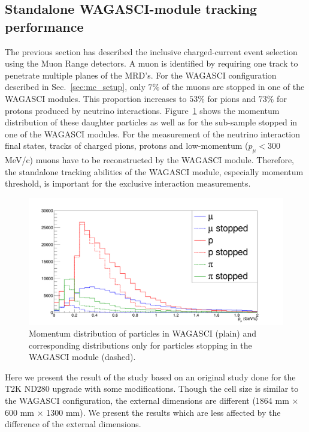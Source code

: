 \subsection{Standalone WAGASCI-module tracking performance}
\label{sec:mc_study_standalone}

The previous section has described the inclusive charged-current event selection using the Muon Range detectors.
A muon is identified by requiring one track to penetrate multiple planes of the MRD's.
For the WAGASCI configuration described in Sec.~\ref{sec:mc_setup}, only $7\%$ of the muons are stopped in one of the WAGASCI modules. 
This proportion increases to $53\%$ for pions and $73\%$ for protons produced by neutrino interactions.%
Figure~\ref{fig:stoppedproportions} shows the momentum distribution of these daughter particles as well as for the sub-sample stopped in one of the WAGASCI modules. 
For the measurement of the neutrino interaction final states, tracks of charged pions, protons and  low-momentum ($p_{\mu} < 300~$MeV/c) muons have to be reconstructed by the WAGASCI module.
Therefore, the standalone tracking abilities of the WAGASCI module, especially momentum threshold,  is important for the exclusive interaction measurements.
%
\begin{figure}[tbhp]
  \centering
\includegraphics[width=.7\textwidth]{fig/StoppedProportionsMomentum.pdf}
\caption{\label{fig:stoppedproportions} Momentum distribution of particles in WAGASCI (plain) and corresponding distributions only for particles stopping in the WAGASCI module (dashed).}
\end{figure}
%

Here we present the result of the study based on an original study done for the T2K ND280 upgrade with some modifications.
Though the cell size is similar to the WAGASCI configuration, the external dimensions are different (1864 mm $\times$ 600 mm $\times$ 1300 mm).
We present the results which are less affected by the difference of the external dimensions.

